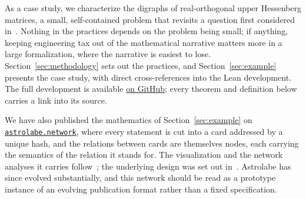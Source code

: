 As a case study, we characterize the digraphs of real-orthogonal upper
Hessenberg matrices, a small, self-contained problem that revisits a question
first considered in~\cite{severini2003a}. Nothing in the practices depends on
the problem being small; if anything, keeping engineering tax out of the
mathematical narrative matters more in a large formalization, where the
narrative is easiest to lose. Section~\ref{sec:methodology} sets out the
practices, and Section~\ref{sec:example} presents the case study, with direct
cross-references into the Lean development. The full development is available
\href{https://github.com/simoneseverini/Digraphs-of-Real-Orthogonal-Upper-Hessenberg-Matrices}{on
GitHub}; every theorem and definition below carries a link into its source.

We have also published the mathematics of Section~\ref{sec:example} on
\href{https://www.astrolabe.network/writing/hessenberg-digraphs}{\texttt{astrolabe.network}},
where every statement is cut into a card addressed by a unique hash, and the
relations between cards are themselves nodes, each carrying the semantics of
the relation it stands for. The visualization and the network analyses it
carries follow~\cite{li2026networkstructuremathlib}; the underlying design was
set out in~\cite{li2026astrolabecontentaddressablehypergraphsemantic}. Astrolabe
has since evolved substantially, and this network should be read as a prototype
instance of an evolving publication format rather than a fixed specification.


